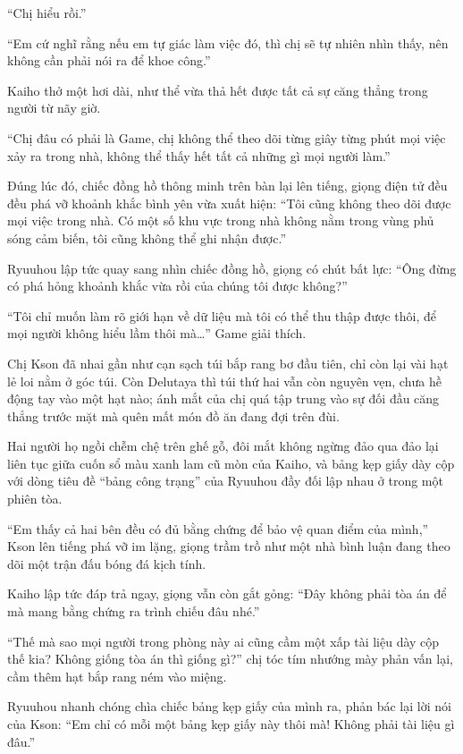 \documentclass[../main.tex]{subfiles}
\begin{document}
``Chị hiểu rồi.''

``Em cứ nghĩ rằng nếu em tự giác làm việc đó, thì chị sẽ tự nhiên nhìn thấy, nên không cần phải nói ra để khoe công.''

Kaiho thở một hơi dài, như thể vừa thả hết được tất cả sự căng thẳng trong người từ nãy giờ.

``Chị đâu có phải là Game, chị không thể theo dõi từng giây từng phút mọi việc xảy ra trong nhà, không thể thấy hết tất cả những gì mọi người làm.''

Đúng lúc đó, chiếc đồng hồ thông minh trên bàn lại lên tiếng, giọng điện tử đều đều phá vỡ khoảnh khắc bình yên vừa xuất hiện: ``Tôi cũng không theo dõi được mọi việc trong nhà. Có một số khu vực trong nhà không nằm trong vùng phủ sóng cảm biến, tôi cũng không thể ghi nhận được.''

Ryuuhou lập tức quay sang nhìn chiếc đồng hồ, giọng có chút bất lực: ``Ông đừng có phá hỏng khoảnh khắc vừa rồi của chúng tôi được không?''

``Tôi chỉ muốn làm rõ giới hạn về dữ liệu mà tôi có thể thu thập được thôi, để mọi người không hiểu lầm thôi mà\dots'' Game giải thích.

\ct

Chị Kson đã nhai gần như cạn sạch túi bắp rang bơ đầu tiên, chỉ còn lại vài hạt lẻ loi nằm ở góc túi. Còn Delutaya thì túi thứ hai vẫn còn nguyên vẹn, chưa hề động tay vào một hạt nào; ánh mắt của chị quá tập trung vào sự đối đầu căng thẳng trước mặt mà quên mất món đồ ăn đang đợi trên đùi.

Hai người họ ngồi chễm chệ trên ghế gỗ, đôi mắt không ngừng đảo qua đảo lại liên tục giữa cuốn sổ màu xanh lam cũ mòn của Kaiho, và bảng kẹp giấy dày cộp với dòng tiêu đề ``bảng công trạng'' của Ryuuhou đầy đối lập nhau ở trong một phiên tòa.

``Em thấy cả hai bên đều có đủ bằng chứng để bảo vệ quan điểm của mình,'' Kson lên tiếng phá vỡ im lặng, giọng trầm trồ như một nhà bình luận đang theo dõi một trận đấu bóng đá kịch tính.

Kaiho lập tức đáp trả ngay, giọng vẫn còn gắt gỏng: ``Đây không phải tòa án để mà mang bằng chứng ra trình chiếu đâu nhé.''

``Thế mà sao mọi người trong phòng này ai cũng cầm một xấp tài liệu dày cộp thế kia? Không giống tòa án thì giống gì?'' chị tóc tím nhướng mày phản vấn lại, cầm thêm hạt bắp rang ném vào miệng.

Ryuuhou nhanh chóng chìa chiếc bảng kẹp giấy của mình ra, phản bác lại lời nói của Kson: ``Em chỉ có mỗi một bảng kẹp giấy này thôi mà! Không phải tài liệu gì đâu.''
\end{document}
